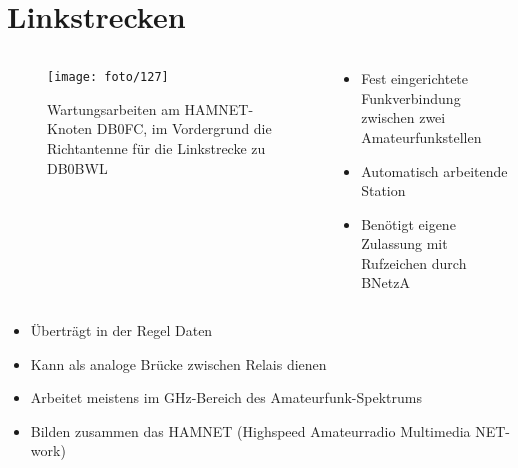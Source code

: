 
\section{Linkstrecken}
\label{section:linkstrecken}
\begin{frame}%

\begin{columns}
    \begin{column}{0.48\textwidth}
    
\begin{figure}
    \texttt{[image: foto/127]}
    \caption{\scriptsize Wartungsarbeiten am HAMNET-Knoten DB0FC, im Vordergrund die Richtantenne für die Linkstrecke zu DB0BWL}
    \label{n_linkstrecken_db0fc}
\end{figure}

    \end{column}
   \begin{column}{0.48\textwidth}
       \begin{itemize}
  \item Fest eingerichtete Funkverbindung zwischen zwei Amateurfunkstellen
  \item Automatisch arbeitende Station
  \item Benötigt eigene Zulassung mit Rufzeichen durch BNetzA
  \end{itemize}

   \end{column}
\end{columns}

\end{frame}

\begin{frame}\begin{itemize}
  \item Überträgt in der Regel Daten
  \item Kann als analoge Brücke zwischen Relais dienen
  \item Arbeitet meistens im GHz-Bereich des Amateurfunk-Spektrums
  \item Bilden zusammen das HAMNET (Highspeed Amateurradio Multimedia NET-work)
  \end{itemize}

\end{frame}

